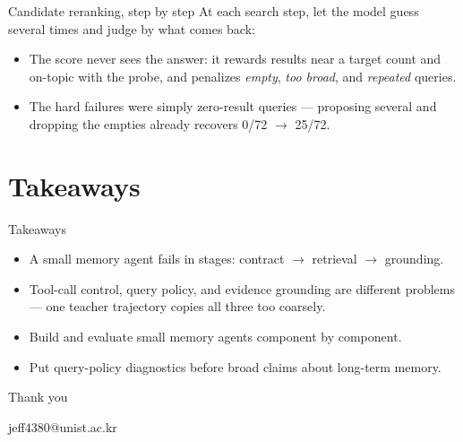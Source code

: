 \documentclass[10pt,aspectratio=169]{beamer}
\begin{document}
\begin{frame}{Candidate reranking, step by step}
  At each search step, let the model guess several times and judge by what comes back:
  \vspace{1.0em}
  \begin{center}
  \end{center}
  \vspace{0.9em}
  \begin{itemize}
    \item The score \alert{never sees the answer}: it rewards results near a target
          count and on-topic with the probe, and penalizes \emph{empty},
          \emph{too broad}, and \emph{repeated} queries.
    \item The hard failures were simply \alert{zero-result} queries --- proposing
          several and dropping the empties already recovers \alert{0/72 $\to$ 25/72}.
  \end{itemize}
\end{frame}

\section{Takeaways}

\begin{frame}{Takeaways}
  \begin{itemize}
    \item A small memory agent fails \alert{in stages}: contract $\to$ retrieval $\to$ grounding.
          \smallskip
    \item Tool-call control, query policy, and evidence grounding are
          \alert{different problems} --- one teacher trajectory copies all three too coarsely.
          \smallskip
    \item Build and evaluate small memory agents \alert{component by component}.
          \smallskip
    \item Put query-policy diagnostics \alert{before} broad claims about long-term memory.
  \end{itemize}
\end{frame}

\begin{frame}[standout]
  Thank you
  \vspace{0.6em}

  {\small\normalfont jeff4380@unist.ac.kr}
\end{frame}
\end{document}
